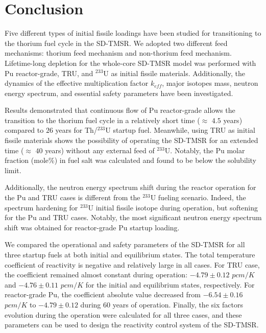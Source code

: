 \section{Conclusion} \label{Conclusion}

Five different types of initial fissile loadings have been studied for 
transitioning to the thorium fuel cycle in the \gls{SD-TMSR}. We 
adopted two different feed mechanisms: thorium feed mechanism and non-thorium 
feed mechanism. Lifetime-long depletion for the whole-core SD-TMSR model was 
performed with Pu reactor-grade, TRU, and $^{233}$U as initial fissile 
materials. Additionally, the dynamics of the effective multiplication factor 
$k_{eff}$, major isotopes mass, neutron energy spectrum, and essential safety 
parameters have been investigated. 

Results demonstrated that continuous flow of Pu reactor-grade allows the 
transition to the thorium fuel cycle in a relatively short time ($\approx$ 
$4.5$ years) compared to $26$ years for Th/$^{233}$U startup fuel. 
Meanwhile, using \gls{TRU} as initial fissile materials shows the possibility 
of operating the SD-TMSR for an extended time ($\approx$ $40$ years) 
without any external feed of $^{233}$U. Notably, the Pu molar fraction (mole\%) in 
fuel salt was calculated and found to be below the solubility limit. 

Additionally, the neutron energy spectrum shift during the reactor operation 
for the Pu and TRU cases is different from the $^{233}$U fueling scenario. 
Indeed, the spectrum hardening for $^{233}$U initial fissile isotope during 
operation, but softening for the Pu and TRU cases. Notably, the most 
significant neutron energy spectrum shift was obtained for reactor-grade Pu 
startup loading. 

We compared the operational and safety parameters of the \gls{SD-TMSR} for all 
three startup fuels at both initial and equilibrium states. The total 
temperature coefficient of reactivity is negative and relatively large in all 
cases. For TRU case, the coefficient remained almost constant during 
operation: $-4.79\pm0.12$ $pcm/K$ and $-4.76\pm0.11$ $pcm/K$ for the initial 
and equilibrium states, respectively. For reactor-grade Pu, the coefficient 
absolute value decreased from $-6.54\pm0.16$ $pcm/K$ to $-4.79\pm0.12$ during 
60 years of operation. Finally, the six factors evolution during the operation 
were calculated for all three cases, and these parameters can be used to 
design the reactivity control system of the \gls{SD-TMSR}.

